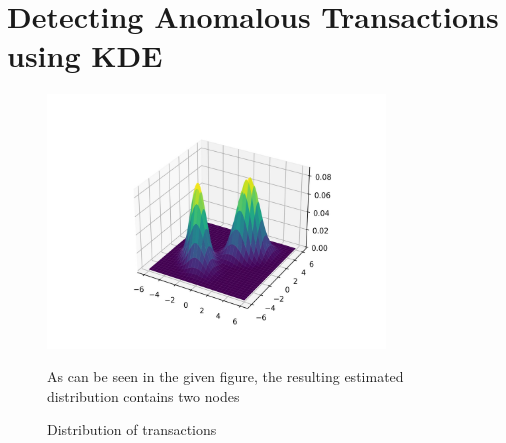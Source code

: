 \section{Detecting Anomalous Transactions using KDE}
\begin{figure}[H]
	\centering
	\includegraphics[width=0.8\textwidth]{transaction_distribution.jpg}
	\caption{Distribution of transactions}

	As can be seen in the given figure, the resulting estimated
	distribution contains two nodes
\end{figure}
